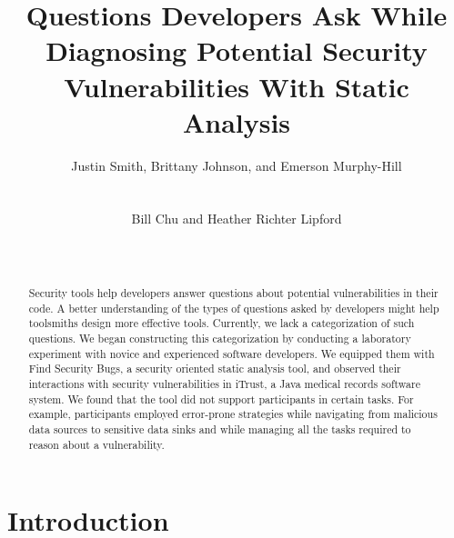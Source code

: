 \documentclass{acm_proc_article-sp}
\newcommand{\blind}[1]{#1}
\begin{document}
\title{Questions Developers Ask While Diagnosing Potential Security Vulnerabilities With Static Analysis}

\author{
\alignauthor Justin Smith, Brittany Johnson, and Emerson Murphy-Hill\\
\\
 \\
\email{}
\alignauthor Bill Chu and Heather Richter Lipford\\
\\
\\
\email{}
}

\maketitle


\begin{abstract}

Security tools help developers answer questions about potential vulnerabilities in their code. 
A better understanding of the types of questions asked by developers might help toolsmiths design more effective tools.
Currently, we lack a categorization of such questions. 
We began constructing this categorization by conducting a laboratory experiment with novice and experienced software developers.
We equipped them with Find Security Bugs, a security oriented static analysis tool, and observed their interactions with security vulnerabilities in iTrust, a Java medical records software system.
We found that the tool did not support participants in certain tasks.
For example, participants employed error-prone strategies while navigating from malicious data sources to sensitive data sinks and while managing all the tasks required to reason about a vulnerability. 

\end{abstract}


\section{Introduction}
\end{document}
